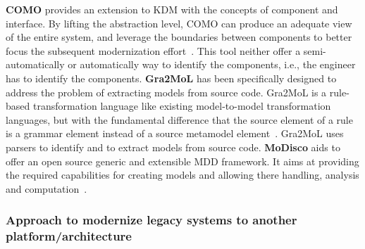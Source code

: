 \textbf{COMO} provides an extension to KDM with the concepts of component and interface. By lifting the abstraction level, COMO can produce an adequate view of the entire system, and leverage the boundaries between components to better focus the subsequent modernization effort~\cite{5773392}. This tool neither offer a semi-automatically or automatically way to identify the components, i.e., the engineer has to identify the components. \textbf{Gra2MoL} has been specifically designed to address the problem of extracting models from source code. Gra2MoL is a rule-based transformation language like existing model-to-model transformation languages, but with the fundamental difference that the source element of a rule is a grammar element instead of a source metamodel element~\cite{5440163}. Gra2MoL uses parsers to identify and to extract models from source code. \textbf{MoDisco} aids to offer an open source generic and extensible MDD framework. It aims at providing the required capabilities for creating models and allowing there handling, analysis and computation~\cite{Bruneliere:2010:MGE:1858996.1859032}.

\subsubsection{Approach to modernize legacy systems to another platform/architecture} %
\label{ssub:approach}

